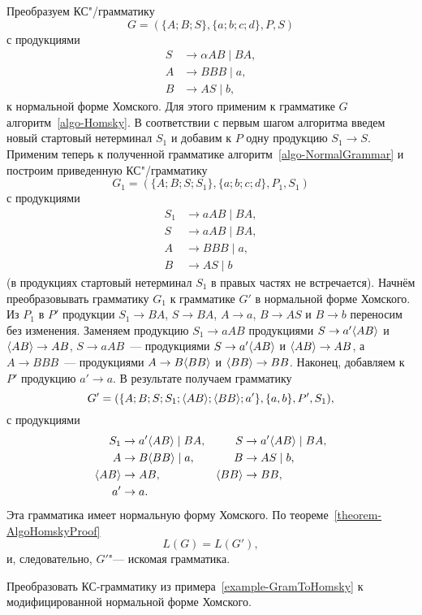 \begin{myexample}
\label{example-GramToHomsky}
Преобразуем КС"/грамматику
\[
G = (\{A;B;S\},\{a;b;c;d\},P,S)
\]
с продукциями
\begin{align*}
	S &\to \alpha AB \mid BA, \\
	A &\to BBB \mid a, \\
	B &\to AS \mid b,
\end{align*}
к нормальной форме Хомского. Для этого применим к грамматике $G$
алгоритм~\ref{algo-Homsky}. В соответствии с первым шагом алгоритма введем новый
стартовый нетерминал $S_1$ и добавим к $P$ одну продукцию $S_1\to S$.
Применим теперь к полученной грамматике алгоритм~\ref{algo-NormalGrammar} и построим
приведенную КС"/грамматику
\[
    G_1 = (\{A;B;S;S_1\},\{a;b;c;d\},P_1,S_1)
\]
с продукциями
\begin{align*}
	S_1 &\to aAB \mid BA, \\
	S &\to aAB \mid BA, \\
    A &\to BBB \mid a, \\
    B &\to AS \mid b
\end{align*}
(в продукциях стартовый нетерминал $S_1$ в правых частях не
встречается). Начнём преобразовывать грамматику $G_1$ к грамматике
$G'$
в нормальной форме Хомского. Из $P_1$ в $P'$ продукции $S_1\to BA$,
$S\to BA$, $A\to a$, $B\to AS$ и $B\to b$ переносим без изменения.
Заменяем продукцию $S_1\to aAB$ продукциями $S\to a' \langle AB \rangle$  и $
\langle AB \rangle \to AB$, $S\to aAB$~--- продукциями $S\to a' \langle AB \rangle$ и $
\langle AB \rangle \to AB$, а $A\to BBB$~--- продукциями $A\to B \langle BB \rangle$ и
$ \langle BB \rangle \to BB$. Наконец, добавляем к $P'$ продукцию $a'\to a$. В
результате получаем грамматику
\[
    G' = (\{A;B;S;S_1;\langle AB \rangle; \langle BB \rangle; a'\},\{a,b\},P',S_1),
\]
с продукциями
\begin{align*}
	S_1 &\to a' \langle AB\rangle \mid BA, &
    S   &\to a'\langle AB\rangle  \mid BA, \\
    A   &\to B \langle BB\rangle \mid a, &
    B   &\to AS \mid b, \\
    \langle AB \rangle &\to AB, &
    \langle BB\rangle  &\to BB, \\
    a' &\to a.
\end{align*}
Эта грамматика имеет нормальную форму Хомского. По теореме~\ref{theorem-AlgoHomskyProof}
\[
    L(G)=L(G'),
\]
и, следовательно, $G'$"--- искомая грамматика.
\end{myexample}

\begin{myproblem}
Преобразовать КС-грамматику из примера~\ref{example-GramToHomsky} к модифицированной нормальной форме Хомского.
\end{myproblem}

